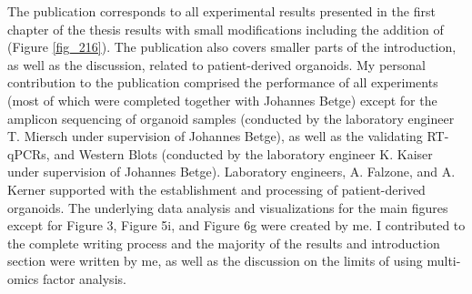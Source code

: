 \begin{flushleft}
\bigbreak
The publication corresponds to all experimental results presented in the first chapter of the thesis results with small modifications including the addition of (Figure \ref{fig_216}). The publication also covers smaller parts of the introduction, as well as the discussion, related to patient-derived organoids. My personal contribution to the publication comprised the performance of all experiments (most of which were completed together with Johannes Betge) except for the amplicon sequencing of organoid samples (conducted by the laboratory engineer T. Miersch under supervision of Johannes Betge), as well as the validating RT-qPCRs, and Western Blots (conducted by the laboratory engineer K. Kaiser under supervision of Johannes Betge). Laboratory engineers, A. Falzone, and A. Kerner supported with the establishment and processing of patient-derived organoids. The underlying data analysis and visualizations for the main figures except for Figure 3, Figure 5i, and Figure 6g were created by me. I contributed to the complete writing process and the majority of the results and introduction section were written by me, as well as the discussion on the limits of using multi-omics factor analysis.


\newpage


\end{flushleft}
